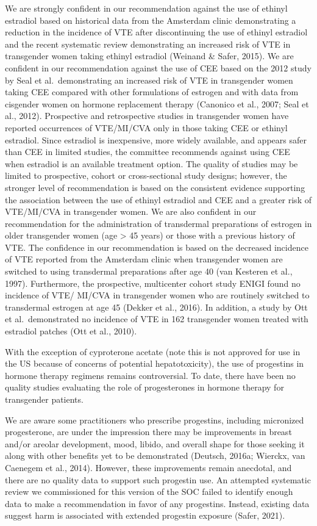 \documentclass[
]{book}
\begin{document}
We are strongly confident in our recommendation against the use of ethinyl estradiol based on
historical data from the Amsterdam clinic demonstrating a reduction in the incidence of VTE after
discontinuing the use of ethinyl estradiol and the
recent systematic review demonstrating an increased
risk of VTE in transgender women taking ethinyl
estradiol (Weinand \& Safer, 2015). We are confident
in our recommendation against the use of CEE
based on the 2012 study by Seal et al.~demonstrating an increased risk of VTE in transgender women
taking CEE compared with other formulations of
estrogen and with data from cisgender women on
hormone replacement therapy (Canonico et al.,
2007; Seal et al., 2012). Prospective and retrospective studies in transgender women have reported
occurrences of VTE/MI/CVA only in those taking
CEE or ethinyl estradiol. Since estradiol is inexpensive, more widely available, and appears safer
than CEE in limited studies, the committee recommends against using CEE when estradiol is an
available treatment option. The quality of studies
may be limited to prospective, cohort or
cross-sectional study designs; however, the stronger
level of recommendation is based on the consistent
evidence supporting the association between the
use of ethinyl estradiol and CEE and a greater risk
of VTE/MI/CVA in transgender women.
We are also confident in our recommendation
for the administration of transdermal preparations of estrogen in older transgender women
(age \textgreater{} 45 years) or those with a previous history
of VTE. The confidence in our recommendation
is based on the decreased incidence of VTE
reported from the Amsterdam clinic when transgender women are switched to using transdermal
preparations after age 40 (van Kesteren et al.,
1997). Furthermore, the prospective, multicenter
cohort study ENIGI found no incidence of VTE/
MI/CVA in transgender women who are routinely
switched to transdermal estrogen at age 45
(Dekker et al., 2016). In addition, a study by Ott
et al.~demonstrated no incidence of VTE in 162
transgender women treated with estradiol patches
(Ott et al., 2010).

With the exception of cyproterone acetate (note
this is not approved for use in the US because
of concerns of potential hepatotoxicity), the use
of progestins in hormone therapy regimens
remains controversial. To date, there have been
no quality studies evaluating the role of progesterones in hormone therapy for transgender
patients.

We are aware some practitioners who prescribe
progestins, including micronized progesterone,
are under the impression there may be improvements in breast and/or areolar development,
mood, libido, and overall shape for those seeking
it along with other benefits yet to be demonstrated (Deutsch, 2016a; Wierckx, van Caenegem
et al., 2014). However, these improvements remain
anecdotal, and there are no quality data to support such progestin use. An attempted systematic
review we commissioned for this version of the
SOC failed to identify enough data to make a
recommendation in favor of any progestins.
Instead, existing data suggest harm is associated
with extended progestin exposure (Safer, 2021).
\end{document}

